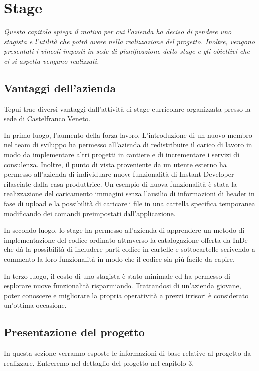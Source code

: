 \chapter{Stage}
\textit{Questo capitolo spiega il motivo per cui l'azienda ha deciso di pendere uno stagista e l'utilità che potrà avere nella realizzazione del progetto. Inoltre, vengono presentati i vincoli imposti in sede di pianificazione dello stage e gli obiettivi che ci si aspetta vengano realizzati.}

\section{Vantaggi dell'azienda}
Tepui trae diversi vantaggi dall'attività di stage curricolare organizzata presso la sede di Castelfranco Veneto.

In primo luogo, l'aumento della forza lavoro. L'introduzione di un nuovo membro nel team di sviluppo ha permesso all'azienda di redistribuire il carico di lavoro in modo da implementare altri progetti in cantiere e di incrementare i servizi di consulenza. Inoltre, il punto di vista proveniente da un utente esterno ha permesso all'azienda di individuare nuove funzionalità di Instant Developer rilasciate dalla casa produttrice.
Un esempio di nuova funzionalità è stata la realizzazione del caricamento immagini senza l'ausilio di informazioni di header in fase di upload e la possibilità di caricare i file in una cartella specifica temporanea modificando dei comandi preimpostati dall'applicazione.

In secondo luogo, lo stage ha permesso all'azienda di apprendere un metodo di implementazione del codice ordinato attraverso la catalogazione offerta da InDe che dà la possibilità di includere parti codice in cartelle e sottocartelle scrivendo a commento la loro funzionalità in modo che il codice sia più facile da capire.

In terzo luogo, il costo di uno stagista è stato minimale ed ha permesso di esplorare nuove funzionalità risparmiando. Trattandosi di un'azienda giovane, poter conoscere e migliorare la propria operatività a prezzi irrisori è considerato un'ottima occasione. 


\section{Presentazione del progetto}
In questa sezione verranno esposte le informazioni di base relative al progetto da realizzare. Entreremo nel dettaglio del progetto nel capitolo 3.
\\

